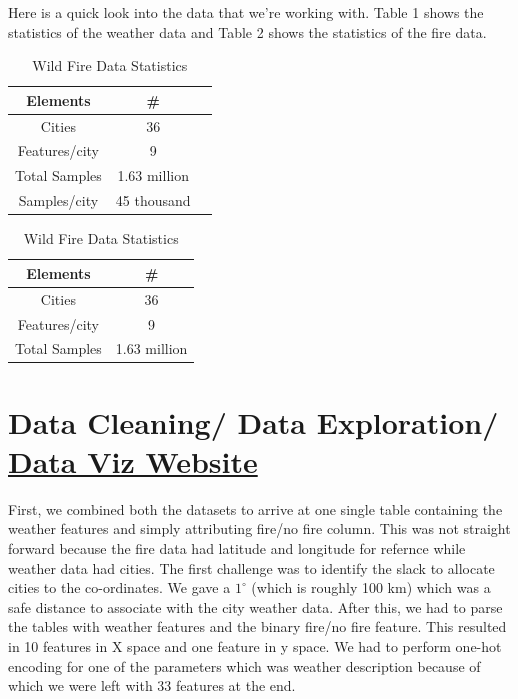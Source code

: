 \documentclass[10pt]{article}
\begin{document}
Here is a quick look into the data that we're working with. Table 1 shows the
statistics of the weather data and Table 2 shows the statistics of the fire
data.\par

\begin{table}[H]
    \centering
    \begin{minipage}[t]{0.45\textwidth}
        \caption{Weather Data Statistics}
        \begin{tabular}{c c c}
            \hline
            Elements & \# \\ %
            \hline
                Cities & 36 \\
                Features/city & 9 \\
                Total Samples & 1.63 million \\
                Samples/city & 45 thousand 
                
        \end{tabular}
    \end{minipage}
    \begin{minipage}[t]{0.45\textwidth}
        \caption{Wild Fire Data Statistics}
        \begin{tabular}{c c}
            \hline
            Elements & \# \\ %
            \hline
            Cities & 36 \\
            Features/city & 9 \\
            Total Samples & 1.63 million\\
        \end{tabular}
    \end{minipage}
\end{table}
\section{Data Cleaning/ Data Exploration/
\href{https://leafyao8621.github.io/firevisualization.github.io/}
{Data Viz Website}}
First, we combined both the datasets to arrive at one single table containing
the weather features and simply attributing fire/no fire column. This was not
straight forward because the fire data had latitude and longitude for refernce
while weather data had cities. The first challenge was to identify the slack to
allocate cities to the co-ordinates. We gave a $1^\circ$ (which is roughly
100 km) which was a safe distance to associate with the city weather data.
After this, we had to parse the tables with weather features and the binary
fire/no fire feature. This resulted in 10 features in X space and one feature
in y space. We had to perform one-hot encoding for one of the parameters which
was weather description because of which we were left with 33 features at the
end.\par
\end{document}
